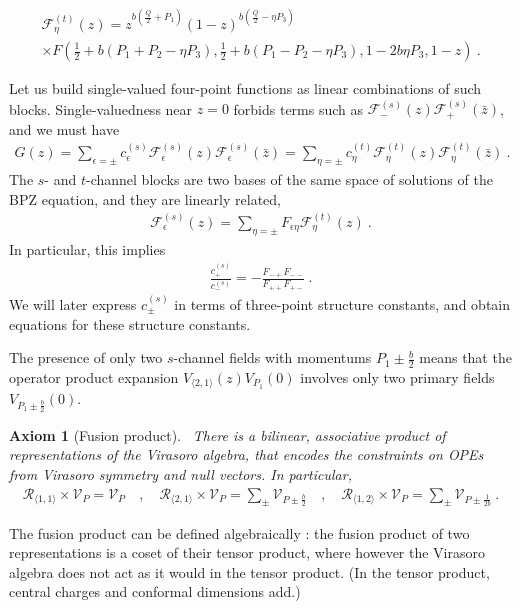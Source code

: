 \documentclass[12pt, a4paper]{article}
\theoremstyle{break}
\newtheorem{hyp}[exo]{Axiom}
\begin{document}
\begin{tcolorbox}
\begin{multline}
 \mathcal{F}^{(t)}_\eta(z) = z^{b(\frac{Q}{2}+P_1)} (1-z)^{b(\frac{Q}{2}-\eta P_3)}
 \\
 \times F\left(\tfrac12 + b(P_1+P_2-\eta P_3), \tfrac12 + b(P_1-P_2-\eta P_3), 1 - 2b\eta P_3, 1-z\right)\ .
 \label{tpm}
\end{multline}
\end{tcolorbox}
Let us build single-valued four-point functions as linear combinations of such blocks. Single-valuedness near $z=0$ forbids terms such as $\mathcal{F}^{(s)}_{-}(z) \mathcal{F}^{(s)}_{+}(\bar z)$, and we must have 
\begin{align}
 G(z) = \sum_{\epsilon=\pm} c^{(s)}_{\epsilon} \mathcal{F}^{(s)}_{\epsilon}(z) \mathcal{F}^{(s)}_{\epsilon}(\bar z) = \sum_{\eta=\pm} c^{(t)}_{\eta} \mathcal{F}^{(t)}_{\eta}(z) \mathcal{F}^{(t)}_{\eta}(\bar z)\ .
 \label{gz}
\end{align}
The $s$- and $t$-channel blocks are two bases of the same space of solutions of the BPZ equation, and they are linearly related,
\begin{align}
 \mathcal{F}^{(s)}_{\epsilon}(z) = \sum_{\eta=\pm} F_{\epsilon\eta} \mathcal{F}^{(t)}_{\eta}(z)\ .
\end{align}
In particular, this implies 
\begin{align}
 \frac{c_{+}^{(s)}}{c_{-}^{(s)}} = -\frac{F_{-+}F_{--}}{F_{++}F_{+-}} \ .
 \label{eq:coc}
\end{align}
We will later express $c_\pm^{(s)}$ in terms of three-point structure constants, and obtain equations for these structure constants.

The presence of only two $s$-channel fields with momentums $P_1\pm \frac{b}{2}$ means that the operator product expansion $V_{\langle 2, 1 \rangle}(z) V_{P_1}(0)$ involves only two primary fields $V_{P_1\pm \frac{b}{2}}(0)$. 

\begin{hyp}[Fusion product]
 ~\label{hyp:fus}
 There is a bilinear, associative product of representations of the Virasoro algebra, that encodes the constraints on OPEs from Virasoro symmetry and null vectors. In particular,
 \begin{align}
  \mathcal{R}_{\langle 1,1\rangle}\times \mathcal V_P = \mathcal V_P \quad , \quad 
  \mathcal{R}_{\langle 2,1\rangle}\times \mathcal V_P = \sum_\pm \mathcal V_{P\pm \frac{b}{2}}\quad , \quad  
  \mathcal{R}_{\langle 1,2\rangle}\times \mathcal V_P = \sum_\pm \mathcal V_{P\pm \frac{1}{2b}}\ .
  \label{eq:rv}
 \end{align}
\end{hyp}
\begin{tcolorbox}
The fusion product can be defined algebraically \cite{gab99}: the fusion product of two representations is a coset of their tensor product, where however the Virasoro algebra does not act as it would in the tensor product. (In the tensor product, central charges and conformal dimensions add.) 
\end{tcolorbox}
\end{document}
